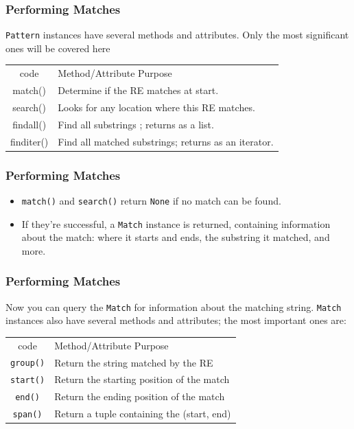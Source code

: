  \begin{frame}[fragile]
\frametitle{Performing Matches } 
\lstinline{Pattern} instances have several
methods and attributes.  Only the most significant ones will be
covered here
\begin{tabular}{c|l}
code & Method/Attribute  Purpose \\
{match()} & {Determine if the RE matches at start.}\\
  {search()} & {Looks for any location where this RE matches.} \\
  {findall()}&{Find all substrings ; returns as a list.}\\
  {finditer()} & {Find all matched substrings; returns as an iterator.}\\
\end{tabular}
\end{frame}

 \begin{frame}[fragile]
\frametitle{Performing Matches } 

\begin{itemize}
\item \lstinline{match()} and \lstinline|search()| return \lstinline|None| if no match
can be found.  
\item If they're successful, a \lstinline|Match| instance is
returned, containing information about the match: where it starts and
ends, the substring it matched, and more.
\end{itemize}
\end{frame}


 \begin{frame}[fragile]
\frametitle{Performing Matches } 

 Now you can query the \lstinline|Match| for information about the
matching string.  \lstinline|Match| instances also have several
methods and attributes; the most important ones are:
\begin{tabular}{c|l}
code & Method/Attribute  Purpose \\
  \lstinline|group()| & {Return the string matched by the RE}\\
  \lstinline|start()| &{Return the starting position of the match}\\
  \lstinline|end()|&{Return the ending position of the match}\\
  \lstinline|span()|&{Return a tuple containing the (start, end)}\\
\end{tabular}

\end{frame}

